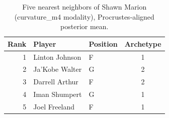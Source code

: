 \begin{table}[htbp]
  \centering\small
  \begin{tabular}{rllc}
    \toprule
    Rank & Player & Position & Archetype \\
    \midrule
    1 & Linton Johnson & F & 1 \\
    2 & Ja'Kobe Walter & G & 2 \\
    3 & Darrell Arthur & F & 2 \\
    4 & Iman Shumpert & G & 1 \\
    5 & Joel Freeland & F & 1 \\
    \bottomrule
  \end{tabular}
  \caption{Five nearest neighbors of Shawn Marion (curvature_m4 modality), Procrustes-aligned posterior mean.}
  \label{tab:Shawn_Marion_neighbors_curvature_m4}
\end{table}

